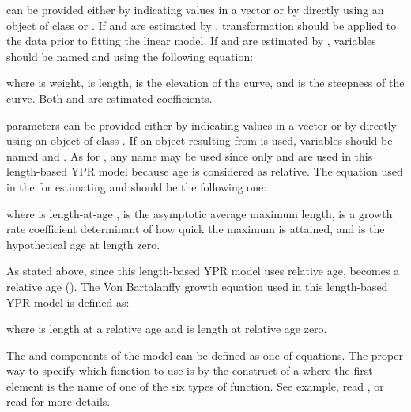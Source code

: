 \documentclass[a4paper]{book}
\begin{document}
\begin{Details}\relax
{} can be provided either by indicating  values in a vector or by 
directly using an object of class  or . If \eqn{\alpha}{} and \eqn{\beta}{} are estimated 
by ,  transformation should be applied to the data prior to fitting the linear model. 
If \eqn{\alpha}{} and \eqn{\beta}{} are estimated by , variables should be named  and  
using the following equation:

where  is weight,  is length, \eqn{\alpha}{} is the elevation of the curve, and \eqn{\beta}{} 
is the steepness of the curve. Both \eqn{\alpha}{} and \eqn{\beta}{} are estimated coefficients.


 parameters can be provided either by indicating  values in a vector or by 
directly using an object of class . If an object resulting from  is used, variables 
should be named  and . As for , any name may be used since only  and  are 
used in this length-based YPR model because age is considered as relative. The equation used in the  for estimating  
and  should be the following one:


where  is length-at-age ,  is the asymptotic average maximum length, 
 is a growth rate coefficient determinant of how quick the maximum is attained, and  
is the hypothetical age at length zero.

As stated above, since this length-based YPR model uses relative age,  becomes a relative age (). 
The Von Bartalanffy growth equation used in this length-based YPR model is defined as:


where  is length at a relative age  and  is length at relative age zero.


The  and  components of the model can be defined 
as one of  equations. The proper 
way to specify which function to use is by the construct of a  where the first element is the 
name of one of the six types of function. See example, read , or read  
for more details.  


\end{Details}
\end{document}

